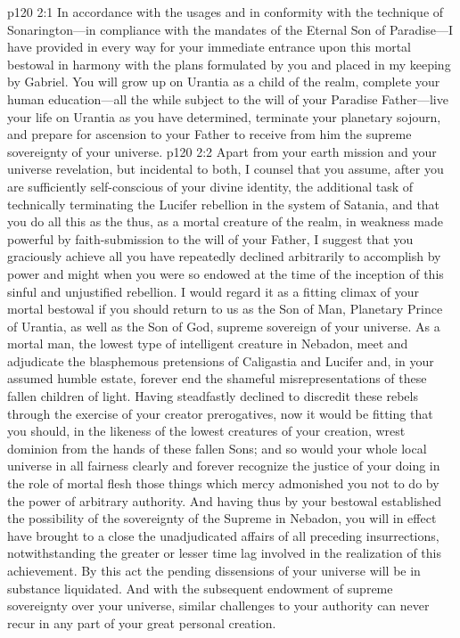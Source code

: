 \vs p120 2:1 \bibnobreakspace In accordance with the usages and in conformity with the technique of Son\-ar\-ing\-ton---in com\-pli\-ance with the mandates of the Eternal Son of Paradise---I have provided in every way for your immediate entrance upon this mortal bestowal in harmony with the plans formulated by you and placed in my keeping by Gabriel. You will grow up on Urantia as a child of the realm, complete your human education---all the while subject to the will of your Paradise Father---live your life on Urantia as you have determined, terminate your planetary sojourn, and prepare for ascension to your Father to receive from him the supreme sovereignty of your universe.\plusone
\pc \vs p120 2:2 \bibnobreakspace Apart from your earth mission and your universe revelation, but incidental to both, I counsel that you assume, after you are sufficiently self\hyp{}conscious of your divine identity, the additional task of technically terminating the Lucifer rebellion in the system of Satania, and that you do all this as the  thus, as a mortal creature of the realm, in weakness made powerful by faith\hyp{}submission to the will of your Father, I suggest that you graciously achieve all you have repeatedly declined arbitrarily to accomplish by power and might when you were so endowed at the time of the inception of this sinful and unjustified rebellion. I would regard it as a fitting climax of your mortal bestowal if you should return to us as the Son of Man, Planetary Prince of Urantia, as well as the Son of God, supreme sovereign of your universe. As a mortal man, the lowest type of intelligent creature in Nebadon, meet and adjudicate the blasphemous pretensions of Caligastia and Lucifer and, in your assumed humble estate, forever end the shameful misrepresentations of these fallen children of light. Having steadfastly declined to discredit these rebels through the exercise of your creator prerogatives, now it would be fitting that you should, in the likeness of the lowest creatures of your creation, wrest dominion from the hands of these fallen Sons; and so would your whole local universe in all fairness clearly and forever recognize the justice of your doing in the role of mortal flesh those things which mercy admonished you not to do by the power of arbitrary authority. And having thus by your bestowal established the possibility of the sovereignty of the Supreme in Nebadon, you will in effect have brought to a close the unadjudicated affairs of all preceding insurrections, notwithstanding the greater or lesser time lag involved in the realization of this achievement. By this act the pending dissensions of your universe will be in substance liquidated. And with the subsequent endowment of supreme sovereignty over your universe, similar challenges to your authority can never recur in any part of your great personal creation.
